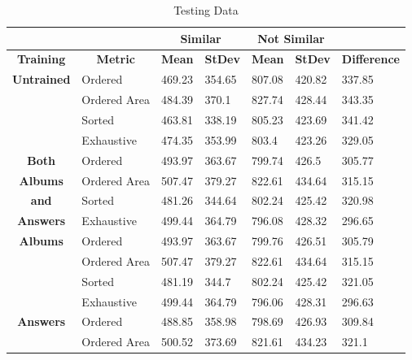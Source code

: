 \begin{table}[hp]
	\caption{Testing Data}
	\label{table:testing_data}
	\centering
\footnotesize \begin{tabular}{|l|l|l|l|l|l|l|}
\cline{3-6}
\multicolumn{1}{c}{} &  & \multicolumn{2}{c|}{\textbf{Similar}} & \multicolumn{2}{c|}{\textbf{Not Similar}} & \multicolumn{1}{l}{} \\ 
\hline
\multicolumn{1}{|c|}{\textbf{Training}} & \multicolumn{1}{c|}{\textbf{Metric}} & \multicolumn{1}{c|}{\textbf{Mean}} & \multicolumn{1}{c|}{\textbf{StDev}} & \multicolumn{1}{c|}{\textbf{Mean}} & \multicolumn{1}{c|}{\textbf{StDev}} & \multicolumn{1}{c|}{\textbf{Difference}} \\ 
\hline
\multicolumn{1}{|c|}{\textbf{Untrained}} & Ordered & 469.23 & 354.65 & 807.08 & 420.82 & 337.85 \\ 
\cline{2-7}
\multicolumn{1}{|c|}{} & Ordered Area & 484.39 & 370.1 & 827.74 & 428.44 & 343.35 \\ 
\cline{2-7}
\multicolumn{1}{|c|}{} & Sorted & 463.81 & 338.19 & 805.23 & 423.69 & 341.42 \\ 
\cline{2-7}
\multicolumn{1}{|c|}{} & Exhaustive & 474.35 & 353.99 & 803.4 & 423.26 & 329.05 \\ 
\hline
\multicolumn{1}{|c|}{\textbf{Both}} & Ordered & 493.97 & 363.67 & 799.74 & 426.5 & 305.77 \\ 
\cline{2-7}
\multicolumn{1}{|c|}{\textbf{Albums}} & Ordered Area & 507.47 & 379.27 & 822.61 & 434.64 & 315.15 \\ 
\cline{2-7}
\multicolumn{1}{|c|}{\textbf{and}} & Sorted & 481.26 & 344.64 & 802.24 & 425.42 & 320.98 \\ 
\cline{2-7}
\multicolumn{1}{|c|}{\textbf{Answers}} & Exhaustive & 499.44 & 364.79 & 796.08 & 428.32 & 296.65 \\ 
\hline
\multicolumn{1}{|c|}{\textbf{Albums}} & Ordered & 493.97 & 363.67 & 799.76 & 426.51 & 305.79 \\ 
\cline{2-7}
\multicolumn{1}{|c|}{} & Ordered Area & 507.47 & 379.27 & 822.61 & 434.64 & 315.15 \\ 
\cline{2-7}
\multicolumn{1}{|c|}{} & Sorted & 481.19 & 344.7 & 802.24 & 425.42 & 321.05 \\ 
\cline{2-7}
\multicolumn{1}{|c|}{} & Exhaustive & 499.44 & 364.79 & 796.06 & 428.31 & 296.63 \\ 
\hline
\multicolumn{1}{|c|}{\textbf{Answers}} & Ordered & 488.85 & 358.98 & 798.69 & 426.93 & 309.84 \\ 
\cline{2-7}
\multicolumn{1}{|c|}{} & Ordered Area & 500.52 & 373.69 & 821.61 & 434.23 & 321.1 \\ 

\end{tabular}
\end{table}
